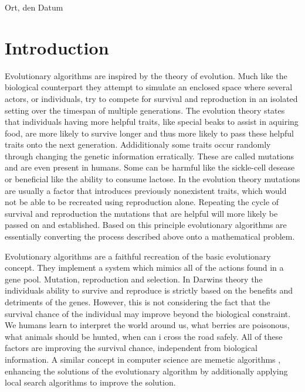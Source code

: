 \documentclass[a4paper,12pt,titlepage, BCOR7mm,headsepline]{scrbook}
\numberwithin{equation}{section}
\begin{document}
\bigskip
\vspace*{1cm}
\noindent
Ort, den Datum

\clearpage

\tableofcontents
\clearpage
\clearpage
\mainmatter
\pagestyle{plain}
\chapter{Introduction}
\pagestyle{headings}
Evolutionary algorithms are inspired by the theory of evolution. Much like the biological counterpart they attempt to simulate 
an enclosed space where several actors, or individuals, try to compete for survival and reproduction in an isolated setting over the timespan of multiple generations.
The evolution theory states that individuals having more helpful traits, like special beaks to assist in aquiring food, are more likely to survive longer and 
thus more likely to pass these helpful traits onto the next generation. Addiditionaly some traits occur randomly through changing the genetic information erratically. These are called mutations and are even present in humans. Some can be harmful like the sickle-cell desease or beneficial like the ability to consume lactose. In the evolution theory mutations 
are usually a factor that introduces previously nonexistent traits, which would not be able to be recreated using reproduction alone. Repeating the cycle of survival and reproduction the mutations that are helpful will more likely be passed on and established. Based on this principle evolutionary algorithms are essentially converting the process described above onto a mathematical problem. 
%
%
%
%
%
%

Evolutionary algorithms are a faithful recreation of the basic evolutionary concept. They implement a system which mimics all of the actions found in a gene pool. Mutation, reproduction and selection. In Darwins theory the individuals ability to survive and reproduce is strictly based on the benefits and detriments of the genes. However, this is not considering the fact that the survival chance of the individual may improve beyond the biological constraint. We humans learn to interpret the world around us, what berries are poisonous, what animals should be hunted, when can i cross the road safely. All of these factors are improving the survival chance, independent from biological information. A similar concept in computer science are memetic algorithms \cite{moscato1989evolution}, enhancing the solutions of the evolutionary algorithm by additionally applying local search algorithms to improve the solution. 
\end{document}

